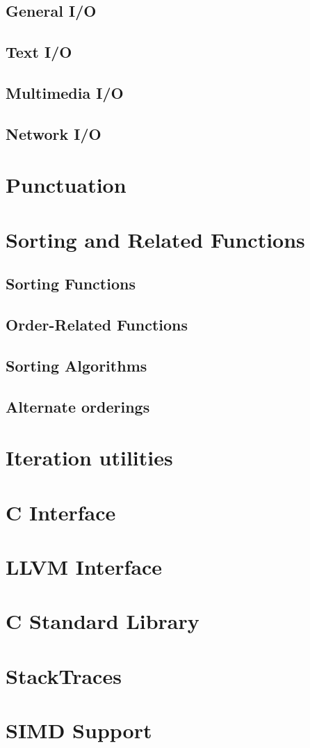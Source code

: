     \section{General I/O}
    \section{Text I/O}
    \section{Multimedia I/O}
    \section{Network I/O}
  \chapter{Punctuation}
  \chapter{Sorting and Related Functions}
    \section{Sorting Functions}
    \section{Order-Related Functions}
    \section{Sorting Algorithms}
    \section{Alternate orderings}
  \chapter{Iteration utilities}
  \chapter{C Interface}
  \chapter{LLVM Interface}
  \chapter{C Standard Library}
  \chapter{StackTraces}
  \chapter{SIMD Support}
